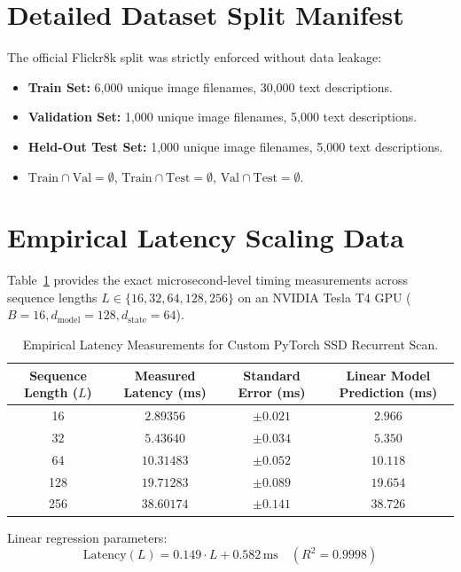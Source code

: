 \documentclass[11pt,journal,onecolumn,draftcls]{IEEEtran}
\begin{document}
\section{Detailed Dataset Split Manifest}
The official Flickr8k split was strictly enforced without data leakage:
\begin{itemize}
    \item \textbf{Train Set:} 6,000 unique image filenames, 30,000 text descriptions.
    \item \textbf{Validation Set:} 1,000 unique image filenames, 5,000 text descriptions.
    \item \textbf{Held-Out Test Set:} 1,000 unique image filenames, 5,000 text descriptions.
    \item $\text{Train} \cap \text{Val} = \emptyset$, $\text{Train} \cap \text{Test} = \emptyset$, $\text{Val} \cap \text{Test} = \emptyset$.
\end{itemize}

\section{Empirical Latency Scaling Data}
Table~\ref{tab:supp_latency} provides the exact microsecond-level timing measurements across sequence lengths $L \in \{16, 32, 64, 128, 256\}$ on an NVIDIA Tesla T4 GPU ($B=16, d_{\text{model}}=128, d_{\text{state}}=64$).

\begin{table}[h]
\centering
\caption{Empirical Latency Measurements for Custom PyTorch SSD Recurrent Scan.}
\label{tab:supp_latency}
\begin{tabular}{cccc}
\toprule
\textbf{Sequence Length ($L$)} & \textbf{Measured Latency (ms)} & \textbf{Standard Error (ms)} & \textbf{Linear Model Prediction (ms)} \\
\midrule
16 & $2.89356$ & $\pm 0.021$ & $2.966$ \\
32 & $5.43640$ & $\pm 0.034$ & $5.350$ \\
64 & $10.31483$ & $\pm 0.052$ & $10.118$ \\
128 & $19.71283$ & $\pm 0.089$ & $19.654$ \\
256 & $38.60174$ & $\pm 0.141$ & $38.726$ \\
\bottomrule
\end{tabular}
\end{table}

Linear regression parameters:
\begin{equation}
\text{Latency}(L) = 0.149 \cdot L + 0.582\,\text{ms} \quad (R^2 = 0.9998)
\end{equation}
\end{document}
